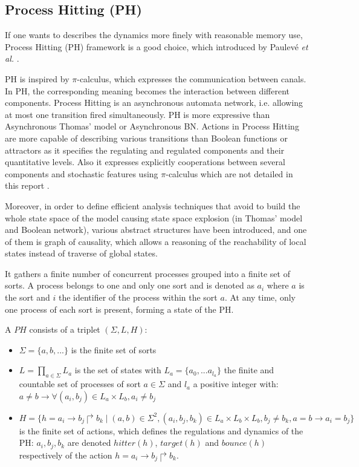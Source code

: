 
\subsection{Process Hitting (PH)}
If one wants to describes the dynamics more finely with reasonable memory use, Process Hitting (PH) framework is a good choice, which introduced by Paulev\'e \textit{et al.} \cite{pauleve2011}.

PH is inspired by $\pi$-calculus, which expresses the communication between canals. 
In PH, the corresponding meaning becomes the interaction between different components.
Process Hitting is an asynchronous automata network, i.e. allowing at most one transition fired simultaneously. 
PH is more expressive than Asynchronous Thomas' model \cite{thomas1978} or Asynchronous BN. 
Actions in Process Hitting are more capable of describing various transitions than Boolean functions or attractors as it specifies the regulating and regulated components and their quantitative levels.
Also it expresses explicitly cooperations between several components and stochastic features using $\pi$-calculus which are not detailed in this report \cite{pauleve2014}.

Moreover, in order to define efficient analysis techniques that avoid to build the whole state space of the model causing state space explosion (in Thomas' model and Boolean network), various abstract structures have been introduced, and one of them is graph of causality, which allows a reasoning of the reachability of local states instead of traverse of global states.

It gathers a finite number of concurrent processes grouped into a finite set of sorts. A process belongs to one and only one sort and is denoted as $a_i$ where $a$ is the sort and $i$ the identifier of the process within the sort $a$.
At any time, only one process of each sort is present, forming a state of the PH.

\begin{definition}
A $PH$ consists of a triplet $(\Sigma, L, H)$:
\begin{itemize}
    \item $\Sigma=\{a,b,...\}$ is the finite set of sorts
    \item $L=\prod_{a\in\Sigma}{L_a}$ is the set of states with $L_a=\{a_0,...a_{l_a}\}$ the finite and countable set of processes of sort $a\in\Sigma$ and $l_a$ a positive integer with: $a\neq b\to \forall(a_i,b_j)\in L_a\times L_b,a_i\neq b_j$
    \item $H=\{h=a_i\to b_j\Rsh b_k\mid(a,b)\in\Sigma^2, (a_i,b_j,b_k)\in L_a\times L_b\times L_b,b_j\neq b_k, a=b\to a_i=b_j\}$ is the finite set of actions, which defines the regulations and dynamics of the PH: $a_i, b_j, b_k$ are denoted $hitter(h)$, $target(h)$ and $bounce(h)$ respectively of the action $h=a_i\to b_j\Rsh b_k$.
\end{itemize}
\end{definition}

